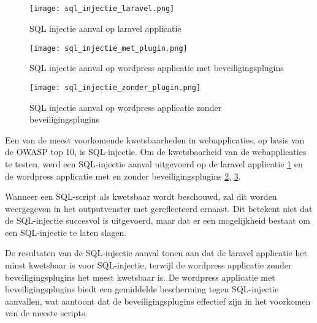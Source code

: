 \subsection{}
\begin{figure}
    \centering
    \texttt{[image: sql\_injectie\_laravel.png]}
    \caption[SQL injectie aanval op laravel applicatie]{SQL injectie aanval op laravel applicatie}
    \label{fig:injectie_laravel}
\end{figure}
\begin{figure}
    \centering
    \texttt{[image: sql\_injectie\_met\_plugin.png]}
    \caption[SQL injectie aanval op wordpress applicatie met beveiligingsplugins]{SQL injectie aanval op wordpress applicatie met beveiligingsplugins}
    \label{fig:injectie_zonder}
\end{figure}
\begin{figure}
    \centering
    \texttt{[image: sql\_injectie\_zonder\_plugin.png]}
    \caption[SQL injectie aanval op wordpress applicatie zonder beveiligingsplugins]{SQL injectie aanval op wordpress applicatie zonder beveiligingsplugins}
    \label{fig:injectie_met}
\end{figure}


Een van de meest voorkomende kwetsbaarheden in webapplicaties, op basis van de OWASP top 10, is SQL-injectie. Om de 
kwetsbaarheid van de webapplicaties 
te testen, werd een SQL-injectie aanval uitgevoerd op de laravel applicatie \ref{fig:injectie_laravel} en de 
wordpress applicatie met en zonder beveiligingsplugins \ref{fig:injectie_zonder}, \ref{fig:injectie_met}. 

Wanneer een SQL-script als kwetsbaar wordt beschouwd, zal dit worden weergegeven in het outputvenster met gereflecteerd ernaast. 
Dit betekent niet dat de SQL-injectie succesvol is uitgevoerd, maar dat er een mogelijkheid bestaat om een SQL-injectie te laten 
slagen. 

De resultaten van de SQL-injectie aanval tonen aan dat de laravel applicatie het minst kwetsbaar is voor SQL-injectie, terwijl 
de wordpress applicatie zonder beveiligingsplugins het meest kwetsbaar is. De wordpress applicatie met beveiligingsplugins 
biedt een gemiddelde bescherming tegen SQL-injectie aanvallen, wat aantoont dat de beveiligingsplugins effectief zijn in het 
voorkomen van de meeste scripts. 

